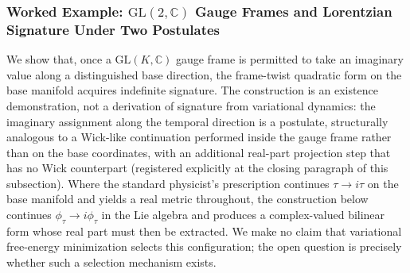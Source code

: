 \documentclass[11pt]{article}
\begin{document}
\subsubsection{Worked Example: $\mathrm{GL}(2, \mathbb{C})$ Gauge Frames and Lorentzian Signature Under Two Postulates}
\label{sec:worked_signature}

We show that, once a $\mathrm{GL}(K, \mathbb{C})$ gauge frame is permitted to take an imaginary value along a distinguished base direction, the frame-twist quadratic form on the base manifold acquires indefinite signature. The construction is an existence demonstration, not a derivation of signature from variational dynamics: the imaginary assignment along the temporal direction is a postulate, structurally analogous to a Wick-like continuation performed inside the gauge frame rather than on the base coordinates, with an additional real-part projection step that has no Wick counterpart (registered explicitly at the closing paragraph of this subsection). Where the standard physicist's prescription continues $\tau \to i\tau$ on the base manifold and yields a real metric throughout, the construction below continues $\phi_\tau \to i\phi_\tau$ in the Lie algebra and produces a complex-valued bilinear form whose real part must then be extracted. We make no claim that variational free-energy minimization selects this configuration; the open question is precisely whether such a selection mechanism exists.
\end{document}
